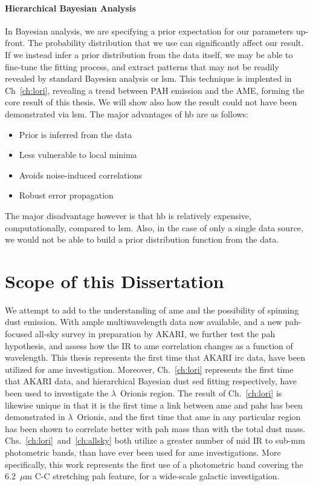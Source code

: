         \paragraph{Hierarchical Bayesian Analysis}
        In Bayesian analysis, we are specifying a prior expectation for our parameters up-front. The probability distribution that we use can significantly affect our result. If we instead infer a prior distribution from the data itself, we may be able to fine-tune the fitting process, and extract patterns that may not be readily revealed by standard Bayesisn analysis or \gls{lsm}. This technique is implented in Ch~\ref{ch:lori}, revealing a trend between PAH emission and the AME, forming the core result of this thesis. We will show also how the result could not have been demonstrated via \gls{lsm}. The major advantages of \gls{hb} are as follows:
            \begin{itemize}
              \setlength{\itemsep}{5pt}
                \item Prior is inferred from the data
                \item Less vulnerable to local minima
                \item Avoids noise-induced correlations
                \item Robust error propagation
            \end{itemize}
        The major disadvantage however is that \gls{hb} is relatively expensive, computationally, compared to \gls{lsm}. Also, in the case of only a single data source, we would not be able to build a prior distribution function from the data.

\section{Scope of this Dissertation}
    We attempt to add to the understanding of \gls{ame} and the possibility of spinning dust emission. With ample multiwavelength data now available, and a new \gls{pah}-focused all-sky survey in preparation by AKARI, we further test the \gls{pah} hypothesis, and assess how the IR to \gls{ame} correlation changes as a function of wavelength. This thesis represents the first time that AKARI \gls{irc} data, have been utilized for \gls{ame} investigation. Moreover, Ch.~\ref{ch:lori} represents the first time that AKARI data, and hierarchical Bayesian dust \gls{sed} fitting respectively, have been used to investigate the $\lambda$~Orionis region. The result of Ch.~\ref{ch:lori} is likewise unique in that it is the first time a link between \gls{ame} and \gls{pah}s has been demonstrated in $\lambda$~Orionis, and the first time that \gls{ame} in any particular region has been shown to correlate better with \gls{pah} mass than with the total dust mass. Chs.~\ref{ch:lori}~and~\ref{ch:allsky} both utilize a greater number of mid IR to sub-mm photometric bands, than have ever been used for \gls{ame} investigations. More specifically, this work represents the first use of a  photometric band covering the 6.2~$\mu$m C-C stretching \gls{pah} feature, for a wide-scale galactic investigation.

